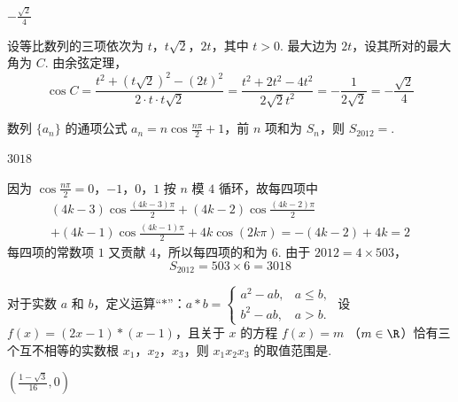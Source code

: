 \begin{answer}
\(-\frac{\sqrt{2}}{4}\)
\end{answer}

\begin{solution}
设等比数列的三项依次为 \(t\)，\(t\sqrt2\)，\(2t\)，其中 \(t>0\). 最大边为 \(2t\)，设其所对的最大角为 \(C\). 由余弦定理，
\[
\cos C=\frac{t^{2}+(t\sqrt2)^{2}-(2t)^{2}}{2\cdot t\cdot t\sqrt2}
=\frac{t^{2}+2t^{2}-4t^{2}}{2\sqrt2 t^{2}}
=-\frac{1}{2\sqrt2}=-\frac{\sqrt2}{4}
\]
\end{solution}

\begin{problem}
数列 \(\{a_{n}\}\) 的通项公式 \(a_{n} = n\cos\frac{n\pi}{2} + 1\)，前 \(n\) 项和为 \(S_{n}\)，则 \(S_{2012} =\)\fillinblank{}.
\end{problem}

\begin{answer}
\(3018\)
\end{answer}

\begin{solution}
因为
\(\cos\frac{n\pi}{2}=0\)，\(-1\)，\(0\)，\(1\)
按 \(n\) 模 \(4\) 循环，故每四项中
\[
\begin{gathered}
(4k-3)\cos\frac{(4k-3)\pi}{2}+(4k-2)\cos\frac{(4k-2)\pi}{2}\\
+(4k-1)\cos\frac{(4k-1)\pi}{2}+4k\cos(2k\pi)=-(4k-2)+4k=2
\end{gathered}
\]
每四项的常数项 \(1\) 又贡献 \(4\)，所以每四项的和为 \(6\). 由于 \(2012=4\times503\)，
\[
S_{2012}=503\times6=3018
\]
\end{solution}

\begin{problem}
对于实数 \(a\) 和 \(b\)，定义运算“\(\ast\)”：\(a \ast b = \begin{cases}
a^{2} - ab, & a \leqslant b,\\
b^{2} - ab, & a > b.
\end{cases}\) 设 \(f(x) = (2x - 1) \ast (x - 1)\)，且关于 \(x\) 的方程 \(f(x) = m\) （\(m \in \R\)）恰有三个互不相等的实数根 \(x_{1}\)，\(x_{2}\)，\(x_{3}\)，则 \(x_{1}x_{2}x_{3}\) 的取值范围是\fillinblank{}.
\end{problem}

\begin{answer}
\(\left(\frac{1-\sqrt{3}}{16},0\right)\)
\end{answer}

